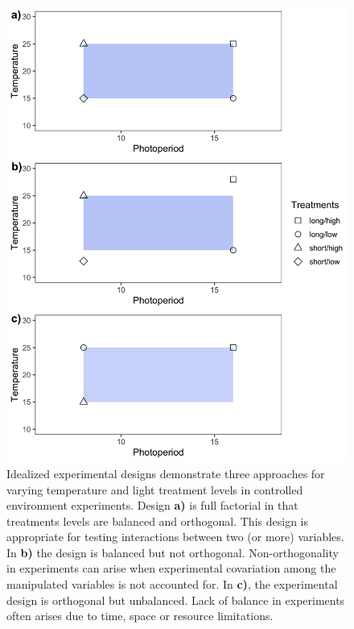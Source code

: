 \documentclass[11pt]{article}
\begin{document}
\begin{figure}[h!]
    \centering
 \includegraphics[width=.8\textwidth]{..//Plots/periodicity_figures/factorial.jpeg}
    \caption{Idealized experimental designs demonstrate three approaches for varying temperature and light treatment levels in controlled environment experiments. Design \textbf{a)} is full factorial in that treatments levels are balanced and orthogonal. This design is appropriate for testing interactions between two (or more) variables. In \textbf{b)} the design is balanced but not orthogonal. Non-orthogonality in experiments can arise when experimental covariation among the manipulated variables is not accounted for. In \textbf{c)}, the experimental design is orthogonal but unbalanced. Lack of balance in experiments often arises due to time, space or resource limitations.}
    \label{fig:examp}
\end{figure}
\end{document}
